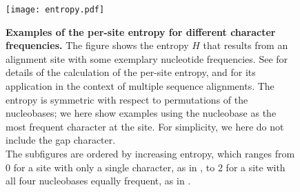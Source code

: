\begin{figure}[thb!p]
    \centering
    \texttt{[image: entropy.pdf]}
    \begin{subfigure}{0pt}
        \label{fig:entropy:sub:a}
    \end{subfigure}
    \begin{subfigure}{0pt}
        \label{fig:entropy:sub:b}
    \end{subfigure}
    \begin{subfigure}{0pt}
        \label{fig:entropy:sub:c}
    \end{subfigure}
    \begin{subfigure}{0pt}
        \label{fig:entropy:sub:d}
    \end{subfigure}
    \begin{subfigure}{0pt}
        \label{fig:entropy:sub:e}
    \end{subfigure}
    \begin{subfigure}{0pt}
        \label{fig:entropy:sub:f}
    \end{subfigure}
    \begin{subfigure}{0pt}
        \label{fig:entropy:sub:g}
    \end{subfigure}
    \begin{subfigure}{0pt}
        \label{fig:entropy:sub:h}
    \end{subfigure}
    \caption[Examples of the per-site entropy for different character frequencies]{
        \textbf{Examples of the per-site entropy for different character frequencies.}
        The figure shows the entropy $H$ that results from an alignment site with some exemplary nucleotide frequencies.
        See 
        for details of the calculation of the per-site entropy,
        and for its application in the context of multiple sequence alignments.
        The entropy is symmetric with respect to permutations of the nucleobases;
        we here show examples using the nucleobase  as the most frequent character at the site.
        For simplicity, we here do not include the gap character.
        \\
        The subfigures are ordered by increasing entropy,
        which ranges from $0$ for a site with only a single character, as in ,
        to $2$ for a site with all four nucleobases equally frequent, as in .
}
\end{figure}
